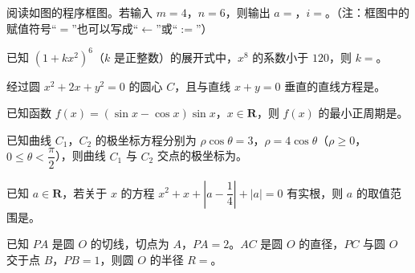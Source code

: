\Needspace{0.4\textheight}
\begingroup
\renewenvironment{question}{\Needspace{0.4\textheight}}{}
\begin{question}
阅读如图的程序框图。若输入 $m=4$，$n=6$，则输出 $a=$\gkblank{}，$i=$\gkblank{}。（注：框图中的赋值符号“$=$”也可以写成“$\leftarrow$”或“$:=$”）
\nopagebreak[4]
\begin{center}\end{center}
\nopagebreak[4]
\end{question}
\endgroup
\begin{question}
已知 $(1+kx^2)^6$（$k$ 是正整数）的展开式中，$x^8$ 的系数小于 $120$，则 $k=$\gkblank{}。

\end{question}
\begin{question}
经过圆 $x^2+2x+y^2=0$ 的圆心 $C$，且与直线 $x+y=0$ 垂直的直线方程是\gkblank{}。

\end{question}
\begin{question}
已知函数 $f(x)=(\sin x-\cos x)\sin x$，$x\in\mathbf R$，则 $f(x)$ 的最小正周期是\gkblank{}。

\end{question}
\begin{question}
已知曲线 $C_1$，$C_2$ 的极坐标方程分别为 $\rho\cos\theta=3$，$\rho=4\cos\theta$（$\rho\geqslant0$，$0\leqslant\theta<\dfrac{\pi}{2}$），则曲线 $C_1$ 与 $C_2$ 交点的极坐标为\gkblank{}。

\end{question}
\begin{question}
已知 $a\in\mathbf R$，若关于 $x$ 的方程 $x^2+x+\left|a-\dfrac14\right|+|a|=0$ 有实根，则 $a$ 的取值范围是\gkblank{}。

\end{question}
\begin{question}
已知 $PA$ 是圆 $O$ 的切线，切点为 $A$，$PA=2$。$AC$ 是圆 $O$ 的直径，$PC$ 与圆 $O$ 交于点 $B$，$PB=1$，则圆 $O$ 的半径 $R=$\gkblank{}。

\end{question}

